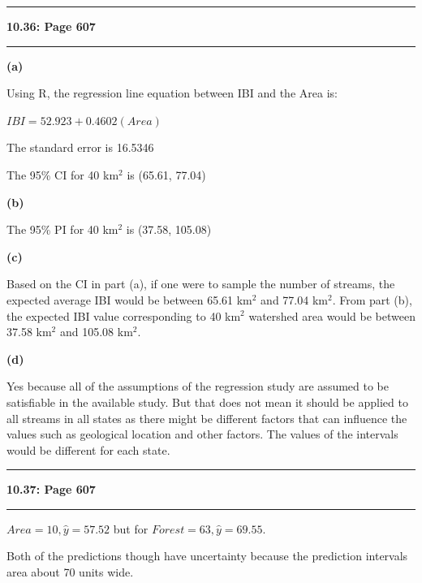 \documentclass[11pt]{article}
\newcommand\question[2]{\vspace{.25in}\hrule\textbf{#1: #2}\vspace{.5em}\hrule\vspace{.10in}}
\renewcommand\part[1]{\vspace{.10in}\textbf{(#1)}\par}
\begin{document}
\question{10.36}{Page 607}
	\part{a}
		Using R, the regression line equation between IBI and the Area is: \par
		$IBI = 52.923 + 0.4602(Area)$\par
		The standard error is 16.5346\par
		The 95\% CI for 40 km$^{2}$ is (65.61, 77.04)\par
	
	\part{b}
		The 95\% PI for 40 km$^{2}$ is (37.58, 105.08)\par
	
	\part{c}
		Based on the CI in part (a), if one were to sample the number of streams, the expected average IBI would be between 65.61 km$^{2}$ and 77.04 km$^{2}$. From part (b), the expected IBI value corresponding to 40 km$^{2}$  watershed area would be between 37.58 km$^{2}$ and 105.08 km$^{2}$.\par
	
	\part{d}
		Yes because all of the assumptions of the regression study are assumed to be satisfiable in the available study. But that does not mean it should be applied to all streams in all states as there might be different factors that can influence the values such as geological location and other factors. The values of the intervals would be different for each state.

\question{10.37}{Page 607}
	$Area = 10, \hat{y} = 57.52$ but for $Forest = 63, \hat{y} = 69.55$.\par
	Both of the predictions though have uncertainty because the prediction intervals area about 70 units wide.\par
	
\end{document}

